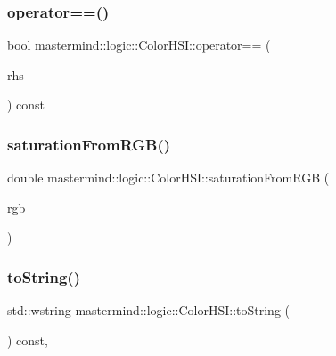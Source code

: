 \hypertarget{classmastermind_1_1logic_1_1_color_h_s_i_a63c8f95133b9c9e9936520e7cd2754fb}{}\label{classmastermind_1_1logic_1_1_color_h_s_i_a63c8f95133b9c9e9936520e7cd2754fb} 
\subsubsection{\texorpdfstring{operator==()}{operator==()}}
{\footnotesize\ttfamily bool mastermind\+::logic\+::\+Color\+H\+S\+I\+::operator== (\begin{DoxyParamCaption}\item[{const \hyperlink{classmastermind_1_1logic_1_1_color_h_s_i}{Color\+H\+SI} \&}]{rhs }\end{DoxyParamCaption}) const}

\hypertarget{classmastermind_1_1logic_1_1_color_h_s_i_aea09217f241f3548c3f45e6706596ada}{}\label{classmastermind_1_1logic_1_1_color_h_s_i_aea09217f241f3548c3f45e6706596ada} 
\subsubsection{\texorpdfstring{saturation\+From\+R\+G\+B()}{saturationFromRGB()}}
{\footnotesize\ttfamily double mastermind\+::logic\+::\+Color\+H\+S\+I\+::saturation\+From\+R\+GB (\begin{DoxyParamCaption}\item[{const \hyperlink{classmastermind_1_1logic_1_1_color_r_g_b}{Color\+R\+GB} \&}]{rgb }\end{DoxyParamCaption})\hspace{0.3cm}{\ttfamily [static]}}

\hypertarget{classmastermind_1_1logic_1_1_color_h_s_i_a2cba1eccd441e55eef75639c2cf9433c}{}\label{classmastermind_1_1logic_1_1_color_h_s_i_a2cba1eccd441e55eef75639c2cf9433c} 
\subsubsection{\texorpdfstring{to\+String()}{toString()}}
{\footnotesize\ttfamily std\+::wstring mastermind\+::logic\+::\+Color\+H\+S\+I\+::to\+String (\begin{DoxyParamCaption}{ }\end{DoxyParamCaption}) const\hspace{0.3cm}{\ttfamily [override]}, {\ttfamily [virtual]}}



